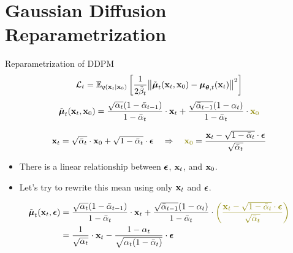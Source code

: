 \documentclass{beamer}
\renewcommand{\eqpause}{}
\renewcommand{\nextonslide}[1]{#1}
\begin{document}
\section{Gaussian Diffusion Reparametrization}
\begin{frame}{Reparametrization of DDPM}
    \[
        \mathcal{L}_t = \mathbb{E}_{q(\mathbf{x}_t | \mathbf{x}_0)} \left[\frac{1}{2\tilde{\beta}_t} \bigl\| \tilde{\boldsymbol{\mu}}_t(\mathbf{x}_t, \mathbf{x}_0) - \boldsymbol{\mu}_{\boldsymbol{\theta}, t}(\mathbf{x}_t) \bigr\|^2  \right]
    \]
    \[
        \tilde{\bmu}_t(\bx_t, \bx_0) = \frac{\sqrt{\alpha_t}(1 - \bar{\alpha}_{t-1})}{1 - \bar{\alpha}_t} \cdot \bx_t + \frac{\sqrt{\bar{\alpha}_{t-1}}(1 - \alpha_t)}{1 - \bar{\alpha}_t} \cdot {\color{olive} \bx_0}
    \]
    \eqpause
    \vspace{-0.2cm}
    \[
        \bx_t = \sqrt{\bar{\alpha}_t} \cdot \bx_0 + \sqrt{1 - \bar{\alpha}_t} \cdot \bepsilon \quad \nextonslide{\Rightarrow \quad {\color{olive} \bx_0} = \frac{\bx_t -  \sqrt{1 - \bar{\alpha}_t} \cdot \bepsilon}{\sqrt{\bar{\alpha}_t}}}
    \]
    \eqpause
    \vspace{-0.3cm}
    \begin{itemize}
        \item There is a linear relationship between $\boldsymbol{\epsilon}$, $\mathbf{x}_t$, and $\mathbf{x}_0$.
        \item Let's try to rewrite this mean using only $\mathbf{x}_t$ and $\boldsymbol{\epsilon}$.
    \end{itemize}
    \eqpause
    \vspace{-0.2cm}
    \begin{align*}
        \tilde{\bmu}_t(\bx_t, \bepsilon) &= \frac{\sqrt{\alpha_t}(1 - \bar{\alpha}_{t-1})}{1 - \bar{\alpha}_t} \cdot \bx_t + \frac{\sqrt{\bar{\alpha}_{t-1}}(1 - \alpha_t)}{1 - \bar{\alpha}_t} \cdot {\color{olive} \left(\frac{\bx_t -  \sqrt{1 - \bar{\alpha}_t} \cdot \bepsilon}{\sqrt{\bar{\alpha}_t}}\right)} \\
        \nextonslide{&= \frac{1}{\sqrt{\alpha_t}} \cdot \bx_t - \frac{1 - \alpha_t}{\sqrt{\alpha_t (1 - \bar{\alpha}_t)}} \cdot \bepsilon}
    \end{align*}
\end{frame}
\end{document}
